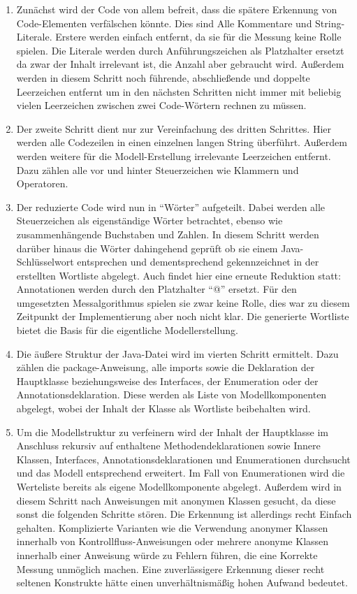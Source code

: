 \documentclass[gb,ngerman]{stthesis}
\begin{document}
			\begin{enumerate}
				\item Zunächst wird der Code von allem befreit, dass die spätere Erkennung von Code-Elementen verfälschen könnte. Dies sind Alle Kommentare und String-Literale. Erstere werden einfach entfernt, da sie für die Messung keine Rolle spielen. Die Literale werden durch Anführungszeichen als Platzhalter ersetzt da zwar der Inhalt irrelevant ist, die Anzahl aber gebraucht wird. Außerdem werden in diesem Schritt noch führende, abschließende und doppelte Leerzeichen entfernt um in den nächsten Schritten nicht immer mit beliebig vielen Leerzeichen zwischen zwei Code-Wörtern rechnen zu müssen.
				\item Der zweite Schritt dient nur zur Vereinfachung des dritten Schrittes. Hier werden alle Codezeilen in einen einzelnen langen String überführt. Außerdem werden weitere für die Modell-Erstellung irrelevante Leerzeichen entfernt. Dazu zählen alle vor und hinter Steuerzeichen wie Klammern und Operatoren.
				\item Der reduzierte Code wird nun in "`Wörter"' aufgeteilt. Dabei werden alle Steuerzeichen als eigenständige Wörter betrachtet, ebenso wie zusammenhängende Buchstaben und Zahlen. In diesem Schritt werden darüber hinaus die Wörter dahingehend geprüft ob sie einem Java-Schlüsselwort entsprechen und dementsprechend gekennzeichnet in der erstellten Wortliste abgelegt. Auch findet hier eine erneute Reduktion statt: Annotationen werden durch den Platzhalter "`@"' ersetzt. Für den umgesetzten Messalgorithmus spielen sie zwar keine Rolle, dies war zu diesem Zeitpunkt der Implementierung aber noch nicht klar. Die generierte Wortliste bietet die Basis für die eigentliche Modellerstellung.
				\item Die äußere Struktur der Java-Datei wird im vierten Schritt ermittelt. Dazu zählen die package-Anweisung, alle imports sowie die Deklaration der Hauptklasse beziehungsweise des Interfaces, der Enumeration oder der Annotationsdeklaration. Diese werden als Liste von Modellkomponenten abgelegt, wobei der Inhalt der Klasse als Wortliste beibehalten wird. 
				\item Um die Modellstruktur zu verfeinern wird der Inhalt der Hauptklasse im Anschluss rekursiv auf enthaltene Methodendeklarationen sowie Innere Klassen, Interfaces, Annotationsdeklarationen und Enumerationen durchsucht und das Modell entsprechend erweitert. Im Fall von Enumerationen wird die Werteliste bereits als eigene Modellkomponente abgelegt. Außerdem wird in diesem Schritt nach Anweisungen mit anonymen Klassen gesucht, da diese sonst die folgenden Schritte stören. Die Erkennung ist allerdings recht Einfach gehalten. Komplizierte Varianten wie die Verwendung anonymer Klassen innerhalb von Kontrollfluss-Anweisungen oder mehrere anonyme Klassen innerhalb einer Anweisung würde zu Fehlern führen, die eine Korrekte Messung unmöglich machen. Eine zuverlässigere Erkennung dieser recht seltenen Konstrukte hätte einen unverhältnismäßig hohen Aufwand bedeutet.

\end{enumerate}
\end{document}
